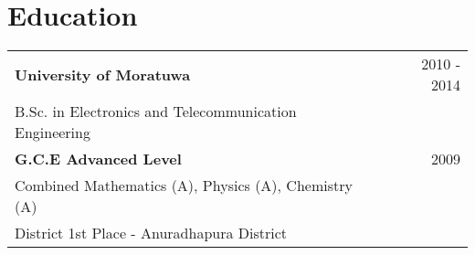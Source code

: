 \documentclass[a4paper,8pt]{article}
\begin{document}
\section{Education}
\begin{tabularx}{\linewidth}{ @{}l r@{} }
\color[HTML]{1C033C} \textbf{University of Moratuwa} & \hfill \color[HTML]{371e77} 2010 - 2014 \\
\color[HTML]{371e77} B.Sc. in Electronics and Telecommunication Engineering & \hfill \color[HTML]{4B28A4} \\[3pt]

\color[HTML]{1C033C} \textbf{G.C.E Advanced Level} & \hfill \color[HTML]{371e77} 2009 \\
\color[HTML]{371e77} Combined Mathematics (A), Physics (A), Chemistry (A) & \hfill \color[HTML]{4B28A4} \\
\color[HTML]{371e77} District 1st Place - Anuradhapura District & \hfill \color[HTML]{4B28A4} \\[3pt]
\end{tabularx}\\[3pt]

\end{document}
